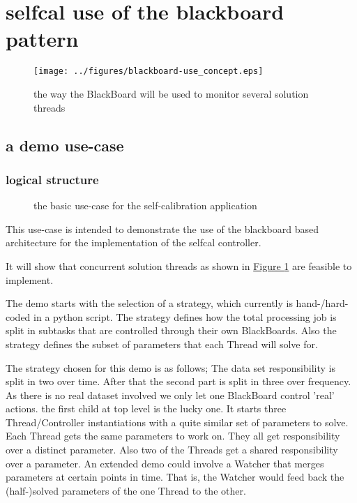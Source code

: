 \documentclass[]{lofar}
\begin{document}
  \section{selfcal use of the blackboard pattern}
  \label{id2712500}\hypertarget{id2712500}{}%
  \begin{figure}
    \texttt{[image: ../figures/blackboard-use\_concept.eps]}
    \label{figure-blackboard-use}\hypertarget{figure-blackboard-use}{}
    \caption{the way the BlackBoard will be used to monitor several
    solution threads}
  \end{figure}

    \subsection{a demo use-case}
    \label{id2719741}\hypertarget{id2719741}{}%
      \subsubsection{logical structure}
      \label{id2719712}\hypertarget{id2719712}{}%
      \begin{figure}
        \label{figure-demo-usecase}\hypertarget{demo-usecase}{}
        \caption{the basic use-case for the self-calibration application}
      \end{figure}

      This use-case is intended to demonstrate the use of the
      blackboard based architecture for the implementation of the
      selfcal controller.

      It will show that concurrent solution threads as shown in
      \hyperlink{figure-blackboard-use}{Figure
      \ref{figure-blackboard-use}} are feasible to implement.

      The demo starts with the selection of a strategy, which
      currently is hand-/hard-coded in a python script. The strategy
      defines how the total processing job is split in subtasks that
      are controlled through their own BlackBoards. Also the strategy
      defines the subset of parameters that each Thread will solve
      for.

      The strategy chosen for this demo is as follows; The data set
      responsibility is split in two over time. After that the second
      part is split in three over frequency. As there is no real
      dataset involved we only let one BlackBoard control 'real'
      actions. the first child at top level is the lucky one. It
      starts three Thread/Controller instantiations with a quite
      similar set of parameters to solve. Each Thread gets the same
      parameters to work on. They all get responsibility over a
      distinct parameter. Also two of the Threads get a shared
      responsibility over a parameter. An extended demo could involve
      a Watcher that merges parameters at certain points in time. That
      is, the Watcher would feed back the (half-)solved parameters of
      the one Thread to the other.
\end{document}

